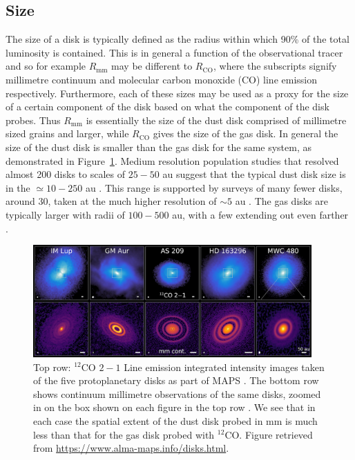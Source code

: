 \subsection{Size}

The size of a disk is typically defined as the radius within which 90\% of the total luminosity is contained.
This is in general a function of the observational tracer and so for example $R_\mathrm{mm}$ may be different to $R_\mathrm{CO}$, where the subscripts signify millimetre continuum and molecular carbon monoxide (CO) line emission respectively. 
Furthermore, each of these sizes may be used as a proxy for the size of a certain component of the disk based on what the component of the disk probes.
Thus $R_\mathrm{mm}$ is essentially the size of the dust disk comprised of millimetre sized grains and larger, while $R_\mathrm{CO}$ gives the size of the gas disk.
In general the size of the dust disk is smaller than the gas disk for the same system, as demonstrated in Figure~\ref{fig:maps_disks}.
Medium resolution population studies that resolved almost 200 disks to scales of $25-50$ au suggest that the typical dust disk size is in the $\simeq 10 - 250$ au \citep{tripathi2017,andrews2018a,hendler2020}.
This range is supported by surveys of many fewer disks, around 30, taken at the much higher resolution of $\sim5$ au \citep{long2018,huang2018b}.
The gas disks are typically larger with radii of $100 - 500$ au, with a few extending out even farther \citep{ansdell2018,zhang2021}.

\begin{figure}
    \centering
    \includegraphics[width = 0.95\textwidth]{figures/Figure-DISKS-Website.png}
    \caption{Top row: $^{12}$CO $2-1$ Line emission integrated intensity images taken of the five protoplanetary disks as part of MAPS \citep{oberg2021}.
    The bottom row shows continuum millimetre observations of the same disks, zoomed in on the box shown on each figure in the top row \citep{andrews2018,huang2020,oberg2021}. 
    We see that in each case the spatial extent of the dust disk probed in mm is much less than that for the gas disk probed with $^{12}$CO.
    Figure retrieved from \url{https://www.alma-maps.info/disks.html}.}
    \label{fig:maps_disks}
\end{figure}


